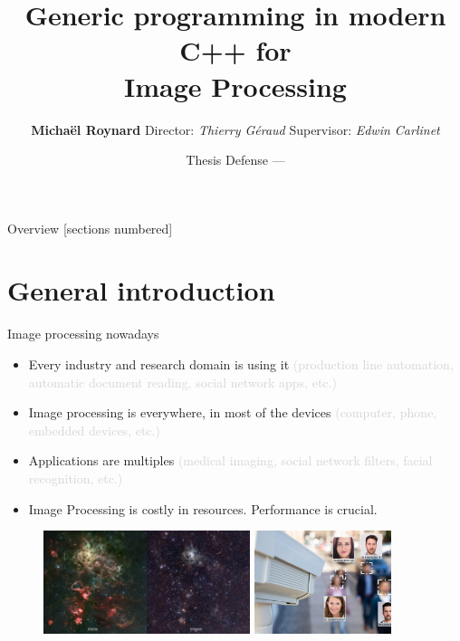 \documentclass[12pt,aspectratio=169]{beamer}
\title{Generic programming in modern C++ for\\ Image Processing}
\date{Thesis Defense --- \displaydate{dateSoutenance}}
\author{\textbf{Michaël Roynard} \hspace{1cm} Director: \emph{Thierry Géraud} \hspace{1cm} Supervisor: \emph{Edwin Carlinet}}
\institute{EPITA Research Laboratory (LRE) --- Le Kremlin-Bicêtre, France}
\newcommand{\GRAYOUT}[1]{\textcolor{lightgray}{#1}}%
\begin{document}
\maketitle

\begin{frame}{Overview}
  [sections numbered]
  \tableofcontents[hideallsubsections]
\end{frame}

%
%
%

\section[General introduction]{General introduction}

\begin{frame}[fragile]{Image processing nowadays}
  \begin{itemize}
    \item Every industry and research domain is using it \GRAYOUT{(production line automation, automatic document
            reading, social network apps, etc.)}
    \item Image processing is everywhere, in most of the devices \GRAYOUT{(computer, phone, embedded devices, etc.)}
    \item Applications are multiples \GRAYOUT{(medical imaging, social network filters, facial recognition, etc.)}
    \item Image Processing is costly in resources. Performance is crucial.
  \end{itemize}
  \begin{figure}[bl]
    \hfill
    \includegraphics[height=3cm]{../illustrations/rgb_infrared}
    \hfill
    \includegraphics[height=3cm]{../illustrations/camera}
    \hspace{1cm}
  \end{figure}
\end{frame}
\end{document}
